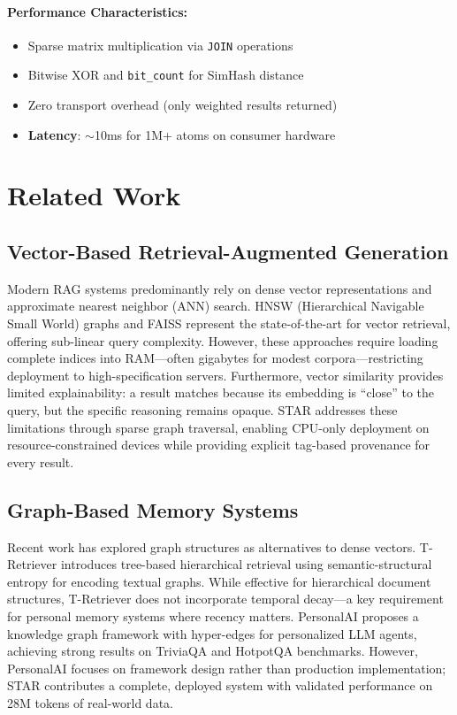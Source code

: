 \documentclass[11pt]{article}
\begin{document}
\paragraph{Performance Characteristics:}
\begin{itemize}
    \item Sparse matrix multiplication via \texttt{JOIN} operations
    \item Bitwise XOR and \texttt{bit\_count} for SimHash distance
    \item Zero transport overhead (only weighted results returned)
    \item \textbf{Latency}: $\sim$10ms for 1M+ atoms on consumer hardware
\end{itemize}

\section{Related Work}
\label{sec:related}

\subsection{Vector-Based Retrieval-Augmented Generation}

Modern RAG systems predominantly rely on dense vector representations and approximate nearest neighbor (ANN) search. HNSW (Hierarchical Navigable Small World) graphs \cite{malkov2018efficient} and FAISS \cite{johnson2019billion} represent the state-of-the-art for vector retrieval, offering sub-linear query complexity. However, these approaches require loading complete indices into RAM---often gigabytes for modest corpora---restricting deployment to high-specification servers. Furthermore, vector similarity provides limited explainability: a result matches because its embedding is ``close'' to the query, but the specific reasoning remains opaque. STAR addresses these limitations through sparse graph traversal, enabling CPU-only deployment on resource-constrained devices while providing explicit tag-based provenance for every result.

\subsection{Graph-Based Memory Systems}

Recent work has explored graph structures as alternatives to dense vectors. T-Retriever \cite{wei2026tretriever} introduces tree-based hierarchical retrieval using semantic-structural entropy for encoding textual graphs. While effective for hierarchical document structures, T-Retriever does not incorporate temporal decay---a key requirement for personal memory systems where recency matters. PersonalAI \cite{menschikov2025personalai} proposes a knowledge graph framework with hyper-edges for personalized LLM agents, achieving strong results on TriviaQA and HotpotQA benchmarks. However, PersonalAI focuses on framework design rather than production implementation; STAR contributes a complete, deployed system with validated performance on 28M tokens of real-world data.
\end{document}
